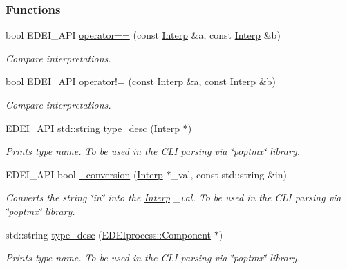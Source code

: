 \subsubsection*{Functions}
\begin{DoxyCompactItemize}
\item 
bool EDEI\_\-API \hyperlink{group__edeiedei_ga3f78c281778943826ca58723ba34544f}{operator==} (const \hyperlink{classInterp}{Interp} \&a, const \hyperlink{classInterp}{Interp} \&b)
\begin{DoxyCompactList}\small\item\em Compare interpretations. \item\end{DoxyCompactList}\item 
bool EDEI\_\-API \hyperlink{group__edeiedei_ga0eca9f735bcba12f1dd183c990f9814f}{operator!=} (const \hyperlink{classInterp}{Interp} \&a, const \hyperlink{classInterp}{Interp} \&b)
\begin{DoxyCompactList}\small\item\em Compare interpretations. \item\end{DoxyCompactList}\item 
EDEI\_\-API std::string \hyperlink{group__edeiedei_ga516b630e8236082e31aba169d8a5e545}{type\_\-desc} (\hyperlink{classInterp}{Interp} $\ast$)
\begin{DoxyCompactList}\small\item\em Prints type name. To be used in the CLI parsing via \char`\"{}poptmx\char`\"{} library. \item\end{DoxyCompactList}\item 
EDEI\_\-API bool \hyperlink{group__edeiedei_ga9a8006fafee97e85fd5c0aedcd86f5ef}{\_\-conversion} (\hyperlink{classInterp}{Interp} $\ast$\_\-val, const std::string \&in)
\begin{DoxyCompactList}\small\item\em Converts the string \char`\"{}in\char`\"{} into the \hyperlink{classInterp}{Interp} \_\-val. To be used in the CLI parsing via \char`\"{}poptmx\char`\"{} library. \item\end{DoxyCompactList}\item 
std::string \hyperlink{group__edeiedei_ga82af3bee7fb3102d94f7b53e89936f77}{type\_\-desc} (\hyperlink{classEDEIprocess_a745d55d7f97f3aafa52998d49d9acde4}{EDEIprocess::Component} $\ast$)
\begin{DoxyCompactList}\small\item\em Prints type name. To be used in the CLI parsing via \char`\"{}poptmx\char`\"{} library. \item\end{DoxyCompactList}\item 

\end{DoxyCompactItemize}
